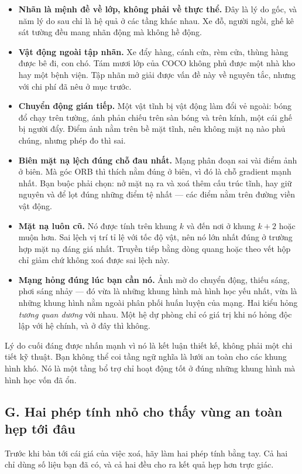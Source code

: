 \documentclass[../../deep_learning.tex]{subfiles}
\begin{document}
\begin{itemize}
\item \textbf{Nhãn là mệnh đề về lớp, không phải về thực thể.} Đây là lý do gốc, và năm lý do sau chỉ là hệ quả ở các tầng khác nhau. Xe đỗ, người ngồi, ghế kê sát tường đều mang nhãn động mà không hề động.
\item \textbf{Vật động ngoài tập nhãn.} Xe đẩy hàng, cánh cửa, rèm cửa, thùng hàng được bê đi, con chó. Tám mươi lớp của COCO không phủ được một nhà kho hay một bệnh viện. Tập nhãn mở giải được vấn đề này về nguyên tắc, nhưng với chi phí đã nêu ở mục trước.
\item \textbf{Chuyển động gián tiếp.} Một vật tĩnh bị vật động làm đổi vẻ ngoài: bóng đổ chạy trên tường, ánh phản chiếu trên sàn bóng và trên kính, một cái ghế bị người đẩy. Điểm ảnh nằm trên bề mặt tĩnh, nên không mặt nạ nào phủ chúng, nhưng phép đo thì sai.
\item \textbf{Biên mặt nạ lệch đúng chỗ đau nhất.} Mạng phân đoạn sai vài điểm ảnh ở biên. Mà góc ORB thì thích nằm đúng ở biên, vì đó là chỗ gradient mạnh nhất. Bạn buộc phải chọn: nở mặt nạ ra và xoá thêm cấu trúc tĩnh, hay giữ nguyên và để lọt đúng những điểm tệ nhất --- các điểm nằm trên đường viền vật động.
\item \textbf{Mặt nạ luôn cũ.} Nó được tính trên khung \(k\) và đến nơi ở khung \(k+2\) hoặc muộn hơn. Sai lệch vị trí tỉ lệ với tốc độ vật, nên nó lớn nhất đúng ở trường hợp mặt nạ đáng giá nhất. Truyền tiếp bằng dòng quang hoặc theo vết hộp chỉ giảm chứ không xoá được sai lệch này.
\item \textbf{Mạng hỏng đúng lúc bạn cần nó.} Ảnh mờ do chuyển động, thiếu sáng, phơi sáng nhảy --- đó vừa là những khung hình mà hình học yếu nhất, vừa là những khung hình nằm ngoài phân phối huấn luyện của mạng. Hai kiểu hỏng \emph{tương quan dương} với nhau. Một hệ dự phòng chỉ có giá trị khi nó hỏng độc lập với hệ chính, và ở đây thì không.
\end{itemize}

Lý do cuối đáng được nhấn mạnh vì nó là kết luận thiết kế, không phải một chi tiết kỹ thuật. Bạn không thể coi tầng ngữ nghĩa là lưới an toàn cho các khung hình khó. Nó là một tầng bổ trợ chỉ hoạt động tốt ở đúng những khung hình mà hình học vốn đã ổn.

\subsection{G. Hai phép tính nhỏ cho thấy vùng an toàn hẹp tới đâu}
Trước khi bàn tới cái giá của việc xoá, hãy làm hai phép tính bằng tay. Cả hai chỉ dùng số liệu bạn đã có, và cả hai đều cho ra kết quả hẹp hơn trực giác.
\end{document}
